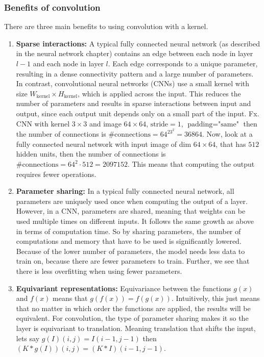 \documentclass[a4paper,12pt]{article}
\begin{document}
\subsubsection{Benefits of convolution}
There are three main benefits to using convolution with a kernel.
\begin{enumerate}
\item \textbf{Sparse interactions:} A typical fully connected neural network (as described in the neural network chapter) contains an edge between each node in layer $l-1$ and each node in layer $l$.
Each edge corresponds to a unique parameter, resulting in a dense connectivity pattern and a large number of parameters. In contrast, convolutional neural networks (CNNs) use a small kernel with size $W_{\text{kernel}} \times H_{\text{kernel}}$, which is applied across the input.
This reduces the number of parameters and results in sparse interactions between input and output, since each output unit depends only on a small part of the input. Fx. CNN with kernel $3 \times 3$ and image $64 \times 64$, $\text{stride} = 1$, $\text{padding} = \text{"same"}$ then the number of connections is $\text{\#connections} = 64^23^2 = 36864$. Now, look at a fully connected neural network with input image of dim $64 \times 64$, that has  $512$ hidden units, then the number of connections is $\text{\#connections} = 64^2\cdot 512=2097152$.
This means that computing the output requires fewer operations.
\item \textbf{Parameter sharing: } In a typical fully connected neural network, all parameters are uniquely used once when computing the output of a layer. However, in a CNN, parameters are shared, meaning that weights can be used multiple times on different inputs. It follows the same growth as above in terms of computation time. So by sharing parameters, the number of computations and memory that have to be used is significantly lowered. Because of the lower number of parameters, the model needs less data to train on, because there are fewer parameters to train. Further, we see that there is less overfitting when using fewer parameters.
\item \textbf{Equivariant representations: } Equivariance between the functions $g(x)$ and $f(x)$ means that $g(f(x)) = f(g(x))$. Intuitively, this just means that no matter in which order the functions are applied, the results will be equivalent. For convolution, the type of parameter sharing makes it so the layer is equivariant to translation. Meaning translation that shifts the input, lets say $g(I)(i,j)=I(i - 1,j - 1)$ then $\left(K * g(I)\right)(i, j)=(K * I)\left(i-1, j-1\right)$.
\end{enumerate}
\end{document}
